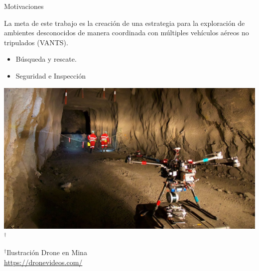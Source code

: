 \documentclass[
  24pt, %
  aspectratio=169, %
]{beamer}
\begin{document}
\begin{frame}{Motivaciones}
  \begin{minipage}{0.47\textwidth}

    \small La meta de este trabajo es la creación de una estrategia para la exploración de ambientes desconocidos de manera coordinada con múltiples vehículos aéreos no tripulados (VANTS).
    \bigskip %
    \begin{itemize}
    \item Búsqueda y rescate.
    \item Seguridad e Inspección
    \end{itemize}
  \end{minipage}
  \hspace{0.2cm}
  \begin{minipage}{0.5\textwidth}
    \includegraphics[width=\textwidth]{maxresdefault.jpg}$^\dag$\\
      \rule{0in}{1.2em}$^\dag$\scriptsize Ilustración Drone en Mina \\
      \tiny \url{https://dronevideos.com/} 
  \end{minipage}
\end{frame}
\end{document}
